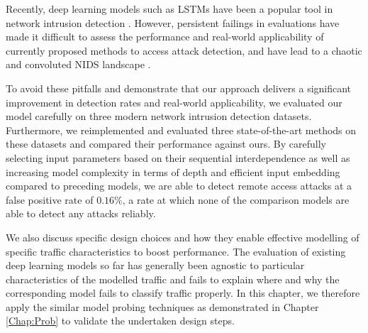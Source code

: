 Recently, deep learning models such as LSTMs have been a popular tool in network intrusion detection \cite{Bontemps2016,kim2016long,radford2018network}. 
However, %
persistent failings in evaluations have made it difficult to assess the performance and real-world applicability of currently proposed methods to access attack detection, and have lead to a chaotic and convoluted NIDS landscape \cite{nisioti2018intrusion}.

To avoid these pitfalls and demonstrate that our approach delivers a significant improvement in detection rates and real-world applicability, we evaluated our model carefully on three modern network intrusion detection datasets. Furthermore, we reimplemented and evaluated three state-of-the-art methods on these datasets and compared their performance against ours. By carefully selecting input parameters based on their sequential interdependence as well as increasing model complexity in terms of depth and efficient input embedding compared to preceding models, we are able to detect remote access attacks at a false positive rate of $0.16\%$, a rate at which none of the comparison models are able to detect any attacks reliably.


We also discuss specific design choices and how they enable effective modelling of specific traffic characteristics to boost performance. The evaluation of existing deep learning models so far has generally been agnostic to particular characteristics of the modelled traffic and fails to explain where and why the corresponding model fails to classify traffic properly. In this chapter, we therefore apply the similar model probing techniques as demonstrated in Chapter \ref{Chap:Prob} to validate the undertaken design steps.


